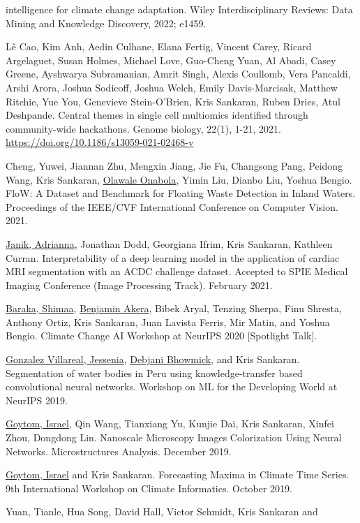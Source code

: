 \documentclass[letterpaper]{article}
\renewenvironment{itemize}{
  \begin{list}{}{
    \setlength{\leftmargin}{1.5em}
  }
}{
  \end{list}
}
\begin{document}
\begin{itemize}
intelligence for climate change adaptation. Wiley Interdisciplinary Reviews:
Data Mining and Knowledge Discovery, 2022; e1459.
\item Lê Cao, Kim Anh, Aedin Culhane, Elana Fertig, Vincent Carey, Ricard
  Argelaguet, Susan Holmes, Michael Love, Guo-Cheng Yuan, Al Abadi, Casey
  Greene, Ayshwarya Subramanian, Amrit Singh, Alexis Coullomb, Vera Pancaldi,
  Arshi Arora, Joshua Sodicoff, Joshua Welch, Emily Davis-Marcisak, Matthew
  Ritchie, Yue You, Genevieve Stein-O’Brien, Kris Sankaran, Ruben Dries, Atul
  Deshpande. Central themes in single cell multiomics identified through
  community-wide hackathons. Genome biology, 22(1), 1-21, 2021.
  \href{https://doi.org/10.1186/s13059-021-02468-y}{https://doi.org/10.1186/s13059-021-02468-y}
\item Cheng, Yuwei, Jiannan Zhu, Mengxin Jiang, Jie Fu, Changsong Pang,
Peidong Wang, Kris Sankaran, \underline{Olawale Onabola}, Yimin Liu, Dianbo Liu, Yoshua
Bengio. FloW: A Dataset and Benchmark for Floating Waste Detection in Inland
Waters. Proceedings of the IEEE/CVF International Conference on Computer
Vision. 2021.
\item \underline{Janik, Adrianna}, Jonathan Dodd, Georgiana Ifrim, Kris Sankaran, Kathleen
  Curran. Interpretability of a deep learning model in the application of
  cardiac MRI segmentation with an ACDC challenge dataset. Accepted to SPIE
  Medical Imaging Conference (Image Processing Track). February 2021.
\item \underline{Baraka, Shimaa}, \underline{Benjamin Akera}, Bibek Aryal,
Tenzing Sherpa, Finu Shresta, Anthony Ortiz, Kris Sankaran, Juan Lavista
Ferris, Mir Matin, and Yoshua Bengio. Climate Change AI Workshop at NeurIPS
2020 [Spotlight Talk].
\item \underline{Gonzalez Villareal, Jessenia}, \underline{Debjani Bhowmick},
and Kris Sankaran. Segmentation of water bodies in Peru using
knowledge-transfer based convolutional neural networks. Workshop on ML for the
Developing World at NeurIPS 2019.
\item \underline{Goytom, Israel}, Qin Wang, Tianxiang Yu, Kunjie Dai, Kris
Sankaran, Xinfei Zhou, Dongdong Lin. Nanoscale Microscopy Images Colorization
Using Neural Networks. Microstructures Analysis. December 2019.
\item \underline{Goytom, Israel} and Kris Sankaran. Forecasting Maxima in
Climate Time Series. 9th International Workshop on Climate Informatics.
October 2019.
\item Yuan, Tianle, Hua Song, David Hall, Victor Schmidt, Kris Sankaran and

\end{itemize}
\end{document}
